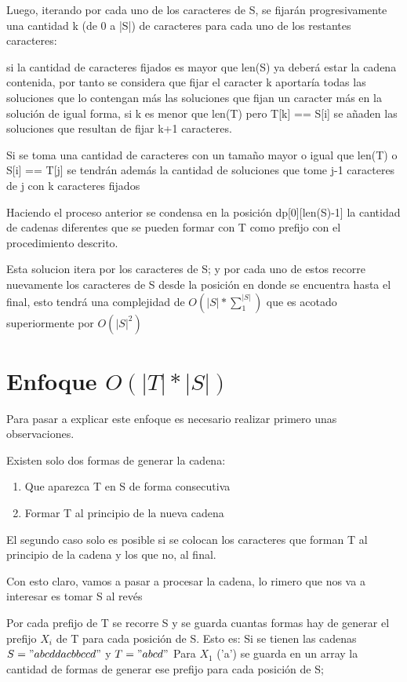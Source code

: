 \documentclass{article}
\begin{document}
Luego, iterando por cada uno de los caracteres de S,
se fijarán progresivamente una cantidad k (de 0 a |S|) de caracteres
para cada uno de los restantes caracteres:

si la cantidad de caracteres fijados es mayor que len(S) ya deberá estar la cadena contenida, por tanto se 
considera que fijar el caracter k aportaría todas las soluciones que lo contengan más las soluciones que fijan un caracter más en la solución
de igual forma, si k es menor que len(T) pero T[k] == S[i] se añaden las soluciones que resultan de fijar k+1 caracteres.

Si se toma una cantidad de caracteres con un tamaño mayor o igual que len(T) o S[i] == T[j] se tendrán además la cantidad de soluciones que tome j-1 caracteres de j con k caracteres fijados

Haciendo el proceso anterior se condensa en la posición dp[0][len(S)-1] la cantidad de cadenas diferentes que se pueden formar con T como prefijo con el procedimiento descrito.

Esta solucion itera por los caracteres de S; y por cada uno de estos recorre nuevamente los caracteres de S desde la posición en donde se encuentra hasta el final, esto tendrá una complejidad
de $O(|S| * \sum_1^{|S|})$ que es acotado superiormente por $O(|S|^2)$


\section{Enfoque $O(|T|*|S|)$}
Para pasar a explicar este enfoque es necesario realizar primero unas observaciones.

Existen solo dos formas de generar la cadena:
\begin{enumerate}
    \item Que aparezca T en S de forma consecutiva
    \item Formar T al principio de la nueva cadena
\end{enumerate}

El segundo caso solo es posible si se colocan los caracteres que forman T al principio de la cadena y los que no, al final.

Con esto claro, vamos a pasar a procesar la cadena, lo rimero que nos va a interesar es tomar S al revés

Por cada prefijo de T se recorre S y se guarda cuantas formas hay de generar el prefijo $X_i$ de T para cada posición de S.
Esto es:
Si se tienen las cadenas $S = "abcddacbbccd"$ y $T = "abcd"$
Para $X_1$ ('a')  se guarda en un array la cantidad de formas de generar ese prefijo para cada posición de S;
\end{document}
